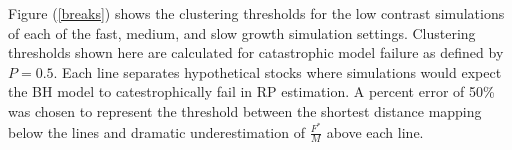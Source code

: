 %
%

Figure (\ref{breaks}) shows the clustering thresholds for the low contrast
simulations of each of the fast, medium, and slow growth simulation settings.
Clustering thresholds shown here are calculated for catastrophic model failure 
as defined by $P=0.5$.  
Each line separates hypothetical stocks where simulations would expect the BH model %
to catestrophically fail in RP estimation. %
A percent error of 50\% was chosen to represent the threshold between the shortest 
distance mapping below the lines and dramatic underestimation of $\frac{F^*}{M}$
above each line.

